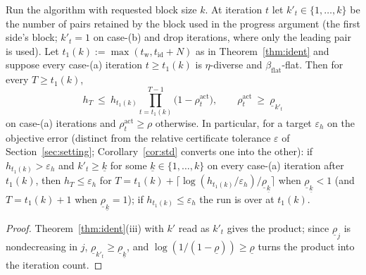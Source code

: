 \begin{corollary}\label{cor:work}
Run the algorithm with requested block size $k$. At iteration $t$ let
$k'_t\in\{1,\dots,k\}$ be the number of pairs retained by the block used
in the progress argument (the first side's block; $k'_t=1$ on case-(b)
and drop iterations, where only the leading pair is used). Let
$t_1(k):=\max(t_{\mathrm w},t_{\mathrm{id}}+N)$ as in
Theorem~\ref{thm:ident} and suppose every case-(a) iteration
$t\ge t_1(k)$ is $\eta$-diverse and $\beta_{\mathrm{flat}}$-flat. Then
for every $T\ge t_1(k)$,
\[
h_T\ \le\ h_{t_1(k)}\prod_{t=t_1(k)}^{T-1}\big(1-\rho^{\mathrm{act}}_t\big),\qquad
\rho^{\mathrm{act}}_t\ \ge\ \underline\rho_{k'_t}
\]
on case-(a) iterations and $\rho^{\mathrm{act}}_t\ge\rho$ otherwise.
In particular, for a target $\varepsilon_h$ on the objective error
(distinct from the relative certificate tolerance $\varepsilon$ of
Section~\ref{sec:setting}; Corollary~\ref{cor:std} converts one into
the other): if $h_{t_1(k)}>\varepsilon_h$ and $k'_t\ge\underline k$ for
some $\underline k\in\{1,\dots,k\}$ on every case-(a) iteration after
$t_1(k)$, then $h_T\le\varepsilon_h$ for
$T=t_1(k)+\big\lceil\log(h_{t_1(k)}/\varepsilon_h)/\underline\rho_{\underline k}\big\rceil$
when $\underline\rho_{\underline k}<1$ (and $T=t_1(k)+1$ when
$\underline\rho_{\underline k}=1$); if $h_{t_1(k)}\le\varepsilon_h$ the
run is over at $t_1(k)$.
\end{corollary}
\begin{proof}
Theorem~\ref{thm:ident}(iii) with $k'$ read as $k'_t$ gives the product;
since $\underline\rho_j$ is nondecreasing in $j$,
$\underline\rho_{k'_t}\ge\underline\rho_{\underline k}$, and
$\log(1/(1-\underline\rho))\ge\underline\rho$ turns the product into the
iteration count.
\end{proof}

